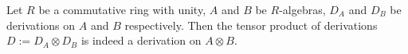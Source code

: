 \begin{proposition}
  Let
  {
    $R$ be a commutative ring with unity,
    $A$ and $B$ be $R$-algebras,
    $D_A$ and $D_B$ be derivations on $A$ and $B$ respectively.
  }
  Then the tensor product of derivations $D := D_A \otimes D_B$
  is indeed a derivation on $A \otimes B$.
\end{proposition}
